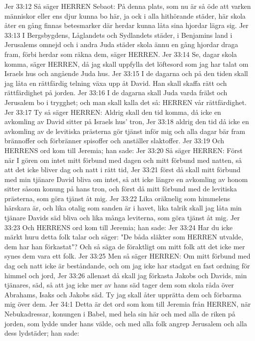 Jer 33:12  Så säger HERREN Sebaot: På denna plats, som nu är så öde att varken människor eller ens djur kunna bo här, ja ock i alla hithörande städer, här skola åter en gång finnas betesmarker där herdar kunna låta sina hjordar lägra sig.
Jer 33:13  I Bergsbygdens, Låglandets och Sydlandets städer, i Benjamins land i Jerusalems omnejd och i andra Juda städer skola ännu en gång hjordar draga fram, förbi herdar som räkna dem, säger HERREN.
Jer 33:14  Se, dagar skola komma, säger HERREN, då jag skall uppfylla det löftesord som jag har talat om Israels hus och angående Juda hus.
Jer 33:15  I de dagarna och på den tiden skall jag låta en rättfärdig telning växa upp åt David. Han skall skaffa rätt och rättfärdighet på jorden.
Jer 33:16  I de dagarna skall Juda varda frälst och Jerusalem bo i trygghet; och man skall kalla det så: HERREN vår rättfärdighet.
Jer 33:17  Ty så säger HERREN: Aldrig skall den tid komma, då icke en avkomling av David sitter på Israels hus' tron,
Jer 33:18  aldrig den tid då icke en avkomling av de levitiska prästerna gör tjänst inför mig och alla dagar bär fram brännoffer och förbränner spisoffer och anställer slaktoffer.
Jer 33:19  Och HERRENS ord kom till Jeremia; han sade:
Jer 33:20  Så säger HERREN: Först när I gören om intet mitt förbund med dagen och mitt förbund med natten, så att det icke bliver dag och natt i rätt tid,
Jer 33:21  först då skall mitt förbund med min tjänare David bliva om intet, så att icke längre en avkomling av honom sitter såsom konung på hans tron, och först då mitt förbund med de levitiska prästerna, som göra tjänst åt mig.
Jer 33:22  Lika oräknelig som himmelens härskara är, och lika otalig som sanden är i havet, lika talrik skall jag låta min tjänare Davids säd bliva och lika många leviterna, som göra tjänst åt mig.
Jer 33:23  Och HERRENS ord kom till Jeremia; han sade:
Jer 33:24  Har du icke märkt huru detta folk talar och säger: "De båda släkter som HERREN utvalde, dem har han förkastat"? Och så säga de föraktligt om mitt folk att det icke mer synes dem vara ett folk.
Jer 33:25  Men så säger HERREN: Om mitt förbund med dag och natt icke är beståndande, och om jag icke har stadgat en fast ordning för himmel och jord,
Jer 33:26  allenast då skall jag förkasta Jakobs och Davids, min tjänares, säd, så att jag icke mer av hans säd tager dem som skola råda över Abrahams, Isaks och Jakobs säd. Ty jag skall åter upprätta dem och förbarma mig över dem.
Jer 34:1  Detta är det ord som kom till Jeremia från HERREN, när Nebukadressar, konungen i Babel, med hela sin här och med alla de riken på jorden, som lydde under hans välde, och med alla folk angrep Jerusalem och alla dess lydstäder; han sade:
